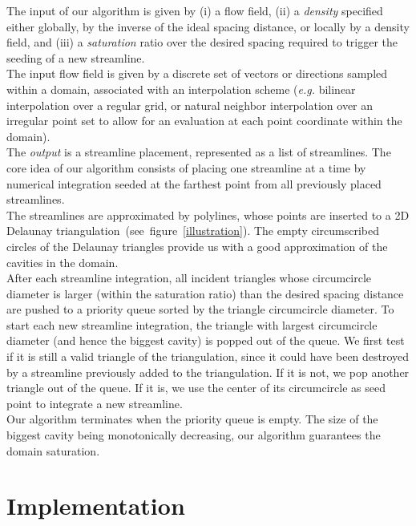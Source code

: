 The input of our algorithm is given by (i) a flow field, (ii) a
\textit{density} specified either globally, by the inverse of the
ideal spacing distance, or locally by a density field, and (iii) a
\textit{saturation} ratio over the desired spacing required to trigger
the seeding of a new streamline.\\


The input flow field is given by a discrete set of vectors or
directions sampled within a domain, associated with an interpolation
scheme (\textit{e.g.} bilinear interpolation over a regular grid, or
natural neighbor interpolation over an irregular point set to allow
for an evaluation at each point coordinate within the domain).\\

The \textit{output} is a streamline placement, represented as a list
of streamlines.  The core idea of our algorithm consists of placing
one streamline at a time by numerical integration seeded at the
farthest point from all previously placed streamlines.\\


The streamlines are approximated by polylines, whose points are
inserted to a 2D Delaunay
triangulation~(see~figure~\ref{illustration}). The empty circumscribed
circles of the Delaunay triangles provide us with a good approximation
of the cavities in the domain.\\

After each streamline integration, all incident triangles whose
circumcircle diameter is larger (within the saturation ratio) than the
desired spacing distance are pushed to a priority queue sorted by the
triangle circumcircle diameter. To start each new streamline
integration, the triangle with largest circumcircle diameter (and
hence the biggest cavity) is popped out of the queue. We first test if
it is still a valid triangle of the triangulation, since it could have
been destroyed by a streamline previously added to the
triangulation. If it is not, we pop another triangle out of the
queue. If it is, we use the center of its circumcircle as seed point
to integrate a new streamline.\\

Our algorithm terminates when the priority queue is empty. The size of
the biggest cavity being monotonically decreasing, our algorithm
guarantees the domain saturation.

\section{Implementation\label{Section_2D_Streamlines_Implementation}}

